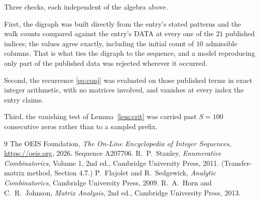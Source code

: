 \documentclass[11pt,a4paper]{article}
\theoremstyle{plain}
\theoremstyle{definition}
\begin{document}
Three checks, each independent of the algebra above.

First, the digraph was built directly from the entry's stated patterns and the walk counts
compared against the entry's DATA at every one of the $21$ published indices; the
values agree exactly, including the initial count of $10$ admissible columns. That is
what ties the digraph to the sequence, and a model reproducing only part of the published
data was rejected wherever it occurred.

Second, the recurrence \eqref{eq:conj} was evaluated on those published terms in exact
integer arithmetic, with no matrices involved, and vanishes at every index the entry claims.

Third, the vanishing test of Lemma~\ref{lem:crit} was carried past $S=100$ consecutive
zeros rather than to a sampled prefix.

\begin{thebibliography}{9}
 The OEIS Foundation, \emph{The On-Line Encyclopedia of Integer
Sequences}, \url{https://oeis.org}, 2026. Sequence A207706.
 R.~P.~Stanley, \emph{Enumerative Combinatorics}, Volume 1, 2nd ed.,
Cambridge University Press, 2011. (Transfer-matrix method, Section 4.7.)
 P.~Flajolet and R.~Sedgewick, \emph{Analytic Combinatorics}, Cambridge
University Press, 2009.
 R.~A.~Horn and C.~R.~Johnson, \emph{Matrix Analysis}, 2nd ed., Cambridge
University Press, 2013.
\end{thebibliography}
\end{document}
